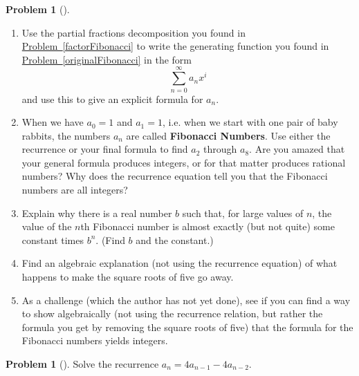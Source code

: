 \documentclass[10pt,]{book}
\newcommand{\terminology}[1]{\textbf{#1}}
\theoremstyle{plain}
\theoremstyle{definition}
\newtheorem{activity}[project]{Problem}
\theoremstyle{definition}
\numberwithin{equation}{chapter}
\begin{document}
\begin{activity}[] \label{solveFibonacci}
\leavevmode%
\begin{enumerate}[font=\bfseries,label=(\alph*),ref=\alph*]
\item\label{task-160} \marginsymbol[-2.5em]{} Use the partial fractions decomposition you found in \hyperref[factorFibonacci]{Problem~\ref{factorFibonacci}} to write the generating function you found in \hyperref[originalFibonacci]{Problem~\ref{originalFibonacci}} in the form%
\begin{equation*}
\sum_{n=0}^\infty a_nx^i
\end{equation*}
and use this to give an explicit formula for \(a_n\).%
\item\label{task-161} \marginsymbol[-2.5em]{} When we have \(a_0=1\) and \(a_1=1\), i.e. when we start with one pair of baby rabbits, the numbers \(a_n\) are called \terminology{Fibonacci Numbers}.  Use either the recurrence or your final formula to find \(a_2\) through \(a_8\).  Are you amazed that your general formula produces integers, or for that matter produces rational numbers?  Why does the recurrence equation tell you that the Fibonacci numbers are all integers?%
\item\label{task-162} \marginsymbol[-2.5em]{} Explain why there is a real number \(b\) such that, for large values of \(n\), the value of the \(n\)th Fibonacci number is almost exactly (but not quite) some constant times \(b^n\). (Find \(b\) and the constant.)%
\item\label{task-163} \marginsymbol[-2.5em]{} Find an algebraic explanation (not using the recurrence equation) of what happens to make the square roots of five go away.%
\item\label{task-164} \marginsymbol[-2.5em]{} As a challenge (which the author has not yet done), see if you can find a way to show algebraically (not using the recurrence relation, but rather the formula you get by removing the square roots of five) that the formula for the Fibonacci numbers yields integers.%
\end{enumerate}
\end{activity}
\begin{activity}[]\marginsymbol[-1em]{} \label{activity-223}
Solve the recurrence \(a_n= 4a_{n-1} - 4a_{n-2}\).%
\end{activity}
\typeout{************************************************}
\typeout{************************************************}
\end{document}
